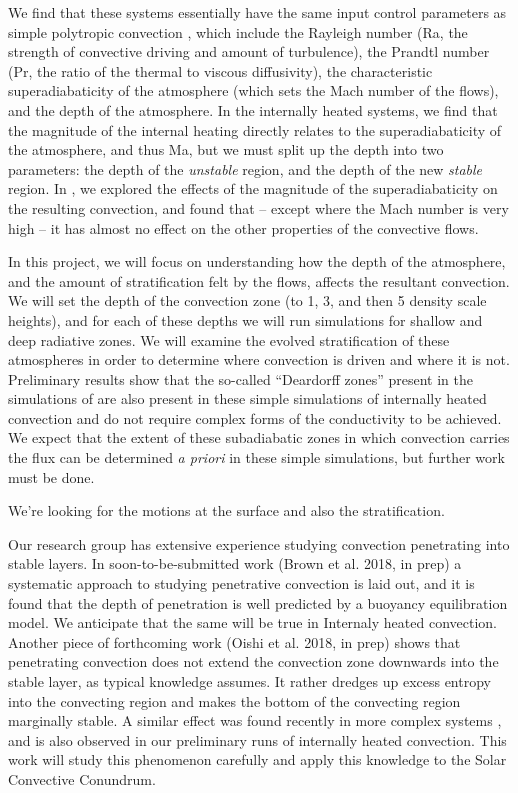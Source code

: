 \documentclass[aasms,12pt]{article}
\begin{document}
We find that these systems essentially have the same input control parameters as simple polytropic
convection \cite{anders&brown2017}, which include the Rayleigh number (Ra, the strength of
convective driving and amount of turbulence), the Prandtl number (Pr, the ratio of the thermal
to viscous diffusivity), the characteristic superadiabaticity of the atmosphere (which sets the Mach
number of the flows), and the depth of the atmosphere.  In the internally heated systems, we
find that the magnitude of the internal heating directly relates to the superadiabaticity of the
atmosphere, and thus Ma, but we must split up the depth into two parameters: the depth of the
\emph{unstable} region, and the depth of the new \emph{stable} region.  In \cite{anders&brown2017},
we explored the effects of the magnitude of the superadiabaticity on the resulting convection,
and found that -- except where the Mach number is very high -- it has almost no effect on the
other properties of the convective flows.  

In this project, we will focus on understanding how the depth of the atmosphere, and the amount
of stratification felt by the flows, affects the resultant convection.  We will set the depth
of the convection zone (to 1, 3, and then 5 density scale heights), and for each of these depths
we will run simulations for shallow and deep radiative zones.  We will examine the evolved
stratification of these atmospheres in order to determine where convection is driven and where
it is not.  Preliminary results show that the so-called ``Deardorff zones'' present in the
simulations of \cite{kapyla&all2017} are also present in these simple simulations of
internally heated convection and do not require complex forms of the conductivity to be achieved.
We expect that the extent of these subadiabatic zones in which convection carries the flux can
be determined \emph{a priori} in these simple simulations, but further work must be done.

We're looking for the motions at the surface and also the stratification.


Our research group has extensive experience studying convection penetrating into stable layers.
In soon-to-be-submitted work (Brown et al. 2018, in prep) a systematic approach to studying
penetrative convection is laid out, and it is found that the depth of penetration is well
predicted by a buoyancy equilibration model.  We anticipate that the same will be true in 
Internaly heated convection.  Another piece of forthcoming work (Oishi et al. 2018, in prep)
shows that penetrating convection does not extend the convection zone downwards into the stable
layer, as typical knowledge assumes.  It rather dredges up excess entropy into the convecting region
and makes the bottom of the convecting region marginally stable.  A similar effect was found
recently in more complex systems \cite{kapyla&all2017}, and is also observed in our preliminary
runs of internally heated convection.  This work will study this phenomenon carefully and apply
this knowledge to the Solar Convective Conundrum.
\end{document}
